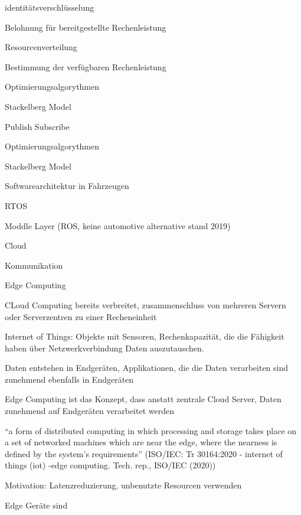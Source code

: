 \begin{notes}
\begin{notes}
        \item identitätsverschlüsselung
        \item Belohnung für bereitgestellte Rechenleistung
    \end{notes}
    \item Resourcenverteilung
    \begin{notes}
        \item Bestimmung der verfügbaren Rechenleistung 
        \item Optimierungsalgorythmen
        \item Stackelberg Model
    \end{notes}
    \item Publish Subscribe
    \begin{notes}
        \item 
        \item Optimierungsalgorythmen
        \item Stackelberg Model
    \end{notes}
    \item Softwarearchitektur in Fahrzeugen
   \begin{notes}
        \item RTOS
        \item Moddle Layer (ROS, keine automotive alternative stand 2019)
        \item Cloud
    \end{notes}

\end{notes}

\begin{notes}
\item Kommunikation
    \begin{notes}
        \item Edge Computing
        \begin{notes}
            \item CLoud Computing bereits verbreitet, zusammenschluss von mehreren Servern oder Serverzentren zu einer Recheneinheit
            \item Internet of Things: Objekte mit Sensoren, Rechenkapazität, die die Fähigkeit haben über Netzwerkverbindung Daten auszutauschen.
            \item Daten entstehen in Endgeräten, Applikationen, die die Daten verarbeiten sind zunehmend ebenfalls in Endgeräten
            \item Edge Computing ist das Konzept, dass anstatt zentrale Cloud Server, Daten zunehmend auf Endgeräten verarbeitet werden
            \item “a form of distributed computing in which processing and storage takes place on a set of networked machines which are near the edge, where the nearness is defined by the system’s requirements”  (ISO/IEC: Tr 30164:2020 - internet of things (iot) -edge computing. Tech. rep., ISO/IEC (2020))
            \item Motivation: Latenzreduzierung, unbenutzte Resourcen verwenden
            \item Edge Geräte sind 
        \end{notes}
    \end{notes}
\end{notes}